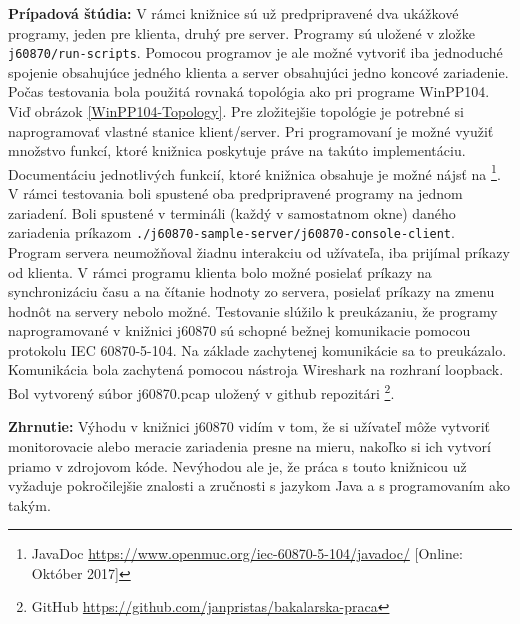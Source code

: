 \noindent \textbf{Prípadová štúdia:} V rámci knižnice sú už predpripravené dva ukážkové programy, jeden pre klienta, druhý pre server. Programy sú uložené v zložke {\tt j60870/run-scripts}. Pomocou programov je ale možné vytvoriť iba jednoduché spojenie obsahujúce jedného klienta a server obsahujúci jedno koncové zariadenie. Počas testovania bola použitá rovnaká topológia ako pri programe WinPP104. Viď obrázok \ref{WinPP104-Topology}. Pre zložitejšie topológie je potrebné si naprogramovať vlastné stanice klient/server. Pri programovaní je možné využiť množstvo funkcí, ktoré knižnica poskytuje práve na takúto implementáciu. Documentáciu jednotlivých funkcií, ktoré knižnica obsahuje je možné nájsť na \footnote{JavaDoc \url{https://www.openmuc.org/iec-60870-5-104/javadoc/} [Online: Október 2017]}. V rámci testovania boli spustené oba predpripravené programy na jednom zariadení. Boli spustené v termináli (každý v samostatnom okne) daného zariadenia príkazom {\tt ./j60870-sample-server/j60870-console-client}. Program servera neumožňoval žiadnu interakciu od užívateľa, iba prijímal príkazy od klienta. V rámci programu klienta bolo možné posielať príkazy na synchronizáciu času a na čítanie hodnoty zo servera, posielať príkazy na zmenu hodnôt na servery nebolo možné. Testovanie slúžilo k preukázaniu, že programy naprogramované v knižnici j60870 sú schopné bežnej komunikacie pomocou protokolu IEC 60870-5-104. Na základe zachytenej komunikácie sa to preukázalo. Komunikácia bola zachytená pomocou nástroja Wireshark na rozhraní loopback. Bol vytvorený súbor j60870.pcap uložený v github repozitári \footnote{GitHub \url{https://github.com/janpristas/bakalarska-praca}}. \par
\noindent \textbf{Zhrnutie:} Výhodu v knižnici j60870 vidím v tom, že si užívateľ môže vytvoriť monitorovacie alebo meracie zariadenia presne na mieru, nakoľko si ich vytvorí priamo v zdrojovom kóde. Nevýhodou ale je, že práca s touto knižnicou už vyžaduje pokročilejšie znalosti a zručnosti s jazykom Java a s programovaním ako takým.


